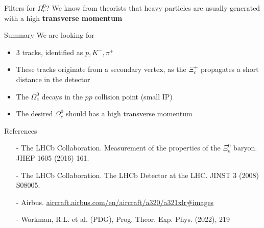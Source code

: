 \begin{frame}{Filters for $\Omega_c^0$?}
We know from theorists that heavy particles are usually generated with a high \textbf{transverse momentum}
\begin{center}
\end{center}
\end{frame}
\begin{frame}{Summary}
We are looking for
\begin{spacing}{1.5}
\begin{itemize}
    \item 3 tracks, identified as $p, K^-, \pi^+$
    \item These tracks originate from a secondary vertex, as the $\Xi_c^+$ propagates a short distance in the detector
    \item The $\Omega_c^0$  decays in the $pp$ collision point (small IP)
    \item The desired $\Omega_c^0$ should has a high transverse momentum
\end{itemize}
\end{spacing}
\end{frame}
\begin{frame}{References} \footnotesize

    \begin{itemize}
\item[-] The LHCb Collaboration. Measurement of the properties of the $\Xi_b^0$ baryon. 	JHEP 1605 (2016) 161.
\item[-] The LHCb Collaboration. The LHCb Detector at the LHC.  JINST 3 (2008) S08005.
\item[-] Airbus. \url{aircraft.airbus.com/en/aircraft/a320/a321xlr#images}
\item[-] Workman, R.L. et al. (PDG), Prog. Theor. Exp. Phys. (2022), 219
\end{itemize}


\end{frame}


